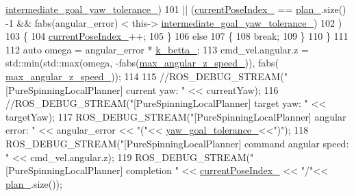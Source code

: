 \begin{DoxyCode}
      \hyperlink{classcl__move__base__z_1_1pure__spinning__local__planner_1_1PureSpinningLocalPlanner_a2e8dfda5e9dea6f09db4056aa90b2aa8}{intermediate\_goal\_yaw\_tolerance\_})
101          || (\hyperlink{classcl__move__base__z_1_1pure__spinning__local__planner_1_1PureSpinningLocalPlanner_aa0f9b4cf52a76e44dc2cfc5103d52dcd}{currentPoseIndex\_} == \hyperlink{classcl__move__base__z_1_1pure__spinning__local__planner_1_1PureSpinningLocalPlanner_a31875ee78bae4698b579e20c0754860d}{plan\_}.size() -1 && fabs(angular\_error) < this->
      \hyperlink{classcl__move__base__z_1_1pure__spinning__local__planner_1_1PureSpinningLocalPlanner_a2e8dfda5e9dea6f09db4056aa90b2aa8}{intermediate\_goal\_yaw\_tolerance\_})
102     )
103     \{
104       \hyperlink{classcl__move__base__z_1_1pure__spinning__local__planner_1_1PureSpinningLocalPlanner_aa0f9b4cf52a76e44dc2cfc5103d52dcd}{currentPoseIndex\_}++;
105     \}
106     \textcolor{keywordflow}{else}
107     \{
108       \textcolor{keywordflow}{break};
109     \}
110   \}
111 
112   \textcolor{keyword}{auto} omega = angular\_error * \hyperlink{classcl__move__base__z_1_1pure__spinning__local__planner_1_1PureSpinningLocalPlanner_a379d2ba057231d76edd1a661d3572d68}{k\_betta\_};
113   cmd\_vel.angular.z = std::min(std::max(omega, -fabs(\hyperlink{classcl__move__base__z_1_1pure__spinning__local__planner_1_1PureSpinningLocalPlanner_a20edb2db356925684de4ee4fe03d5992}{max\_angular\_z\_speed\_})), fabs(
      \hyperlink{classcl__move__base__z_1_1pure__spinning__local__planner_1_1PureSpinningLocalPlanner_a20edb2db356925684de4ee4fe03d5992}{max\_angular\_z\_speed\_}));
114 
115   \textcolor{comment}{//ROS\_DEBUG\_STREAM("[PureSpinningLocalPlanner] current yaw: " << currentYaw);}
116   \textcolor{comment}{//ROS\_DEBUG\_STREAM("[PureSpinningLocalPlanner] target yaw: " << targetYaw);}
117   ROS\_DEBUG\_STREAM(\textcolor{stringliteral}{"[PureSpinningLocalPlanner] angular error: "} << angular\_error << \textcolor{stringliteral}{"("}<<
      \hyperlink{classcl__move__base__z_1_1pure__spinning__local__planner_1_1PureSpinningLocalPlanner_a07334cd7bf29f391c2553f0038fa94e8}{yaw\_goal\_tolerance\_}<<\textcolor{stringliteral}{")"});
118   ROS\_DEBUG\_STREAM(\textcolor{stringliteral}{"[PureSpinningLocalPlanner] command angular speed: "} << cmd\_vel.angular.z);
119   ROS\_DEBUG\_STREAM(\textcolor{stringliteral}{"[PureSpinningLocalPlanner] completion "} << \hyperlink{classcl__move__base__z_1_1pure__spinning__local__planner_1_1PureSpinningLocalPlanner_aa0f9b4cf52a76e44dc2cfc5103d52dcd}{currentPoseIndex\_} << \textcolor{stringliteral}{"/"}<< 
      \hyperlink{classcl__move__base__z_1_1pure__spinning__local__planner_1_1PureSpinningLocalPlanner_a31875ee78bae4698b579e20c0754860d}{plan\_}.size());

\end{DoxyCode}
